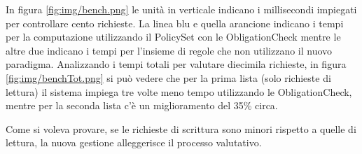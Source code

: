 In figura \ref{fig:img/bench.png} le unità in verticale indicano i millisecondi impiegati per controllare cento richieste.
La linea blu e quella arancione indicano i tempi per la computazione utilizzando il PolicySet con le ObligationCheck
mentre le altre due indicano i tempi per l'insieme di regole che non utilizzano il nuovo paradigma.
Analizzando i tempi totali per valutare diecimila richieste, in figura \ref{fig:img/benchTot.png} si può vedere che
per la prima lista (solo richieste di lettura) il sistema impiega tre volte meno tempo utilizzando le ObligationCheck, mentre per la
seconda lista c'è un miglioramento del 35\% circa.

Come si voleva provare, se le richieste di scrittura sono minori rispetto a quelle di lettura, la nuova gestione
alleggerisce il processo valutativo.
